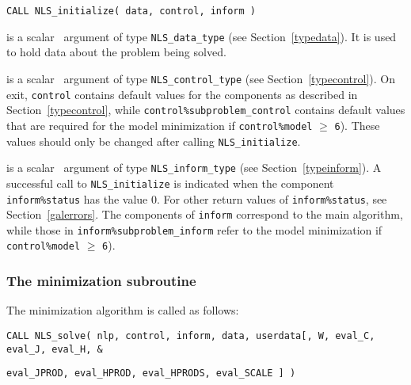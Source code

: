 \documentclass{galahad}
\newcommand{\packagename}{NLS}
\begin{document}
\hspace{8mm}
{\tt CALL \packagename\_initialize( data, control, inform )}

\vspace*{-3mm}
\begin{description}

 is a scalar \intentinout\ argument of type
{\tt \packagename\_data\_type}
(see Section~\ref{typedata}). It is used to hold data about the problem being
solved.

 is a scalar \intentout\ argument of type
{\tt \packagename\_control\_type}
(see Section~\ref{typecontrol}).
On exit, {\tt control} contains default values for the components as
described in Section~\ref{typecontrol}, while
{\tt control\%subproblem\_control} contains default values that are required for the
model minimization if {\tt control\%model} $\geq$ {\tt 6}).
These values should only be changed after calling
{\tt \packagename\_initialize}.

 is a scalar \intentout\ argument of type
{\tt \packagename\_inform\_type}
(see Section~\ref{typeinform}). A successful call to
{\tt \packagename\_initialize}
is indicated when the  component {\tt inform\%status} has the value 0.
For other return values of {\tt inform\%status}, see
Section~\ref{galerrors}.
The components of {\tt inform} correspond to the main algorithm, while
those in {\tt inform\%subproblem\_inform} refer to the model minimization
if {\tt control\%model} $\geq$ {\tt 6}).

\end{description}


\subsubsection{The minimization subroutine}
The minimization algorithm is called as follows:
\vspace*{1mm}

\hspace{8mm}
{\tt CALL \packagename\_solve( nlp, control, inform, data, userdata[, W,
   eval\_C, eval\_J, eval\_H, \hspace{3mm}                  \&}
\vspace*{-5mm}

\hspace{37mm}
{\tt eval\_JPROD,  eval\_HPROD, eval\_HPRODS, eval\_SCALE ] )}
\end{document}
